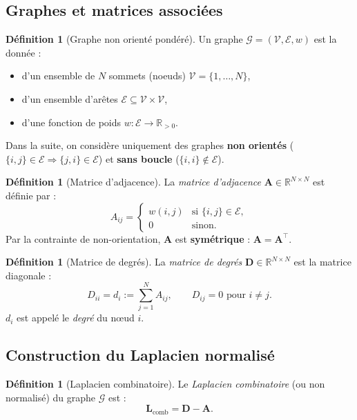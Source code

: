 \documentclass[12pt, a4paper]{article}
\theoremstyle{definition}
\newtheorem{definition}[theorem]{Définition}
\newcommand{\R}{\mathbb{R}}
\newcommand{\calG}{\mathcal{G}}
\newcommand{\calV}{\mathcal{V}}
\newcommand{\calE}{\mathcal{E}}
\newcommand{\mat}[1]{\mathbf{#1}}
\newcommand{\A}{\mat{A}}
\newcommand{\D}{\mat{D}}
\newcommand{\L}{\mat{L}}
\begin{document}
\subsection{Graphes et matrices associées}

\begin{definition}[Graphe non orienté pondéré]
Un graphe $\calG = (\calV, \calE, w)$ est la donnée :
\begin{itemize}
  \item d'un ensemble de $N$ sommets (noeuds) $\calV = \{1, \ldots, N\}$,
  \item d'un ensemble d'arêtes $\calE \subseteq \calV \times \calV$,
  \item d'une fonction de poids $w : \calE \to \R_{>0}$.
\end{itemize}
Dans la suite, on considère uniquement des graphes \textbf{non orientés}
($\{i,j\} \in \calE \Rightarrow \{j,i\} \in \calE$) et \textbf{sans boucle}
($\{i,i\} \notin \calE$).
\end{definition}

\begin{definition}[Matrice d'adjacence]
La \emph{matrice d'adjacence} $\A \in \R^{N \times N}$ est définie par :
\[
  A_{ij} =
  \begin{cases}
    w(i,j) & \text{si } \{i,j\} \in \calE, \\
    0       & \text{sinon.}
  \end{cases}
\]
Par la contrainte de non-orientation, $\A$ est \textbf{symétrique} : $\A = \A^\top$.
\end{definition}

\begin{definition}[Matrice de degrés]
La \emph{matrice de degrés} $\D \in \R^{N \times N}$ est la matrice diagonale :
\[
  D_{ii} = d_i := \sum_{j=1}^{N} A_{ij}, \qquad D_{ij} = 0 \text{ pour } i \neq j.
\]
$d_i$ est appelé le \emph{degré} du nœud $i$.
\end{definition}

\subsection{Construction du Laplacien normalisé}

\begin{definition}[Laplacien combinatoire]
Le \emph{Laplacien combinatoire} (ou non normalisé) du graphe $\calG$ est :
\[
  \L_{\mathrm{comb}} = \D - \A.
\]
\end{definition}
\end{document}
